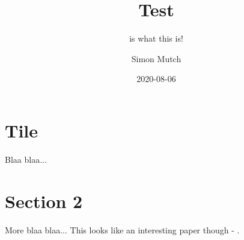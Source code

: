 \documentclass{simons}
\title{Test}
\subtitle{is what this is!}
\author{Simon Mutch}
\date{2020-08-06}
\begin{document}
\maketitle

\section{Tile}
\label{project-title}

Blaa blaa...

\section{Section 2}
\label{aims-and-background}

More blaa blaa... This looks like an interesting paper though - \citet{Mutch:2016}.



\end{document}
